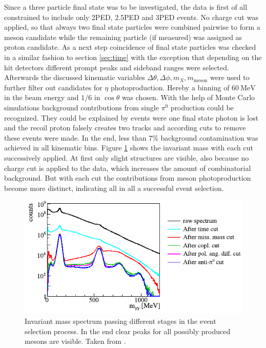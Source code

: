 Since a three particle final state was to be investigated, the data is first of all constrained to include only 2PED, 2.5PED and 3PED events. No charge cut was applied, so that always two final state particles were combined pairwise to form a meson candidate while the remaining particle (if measured) was assigned as proton candidate. As a next step coincidence of final state particles was checked in a similar fashion to section \ref{sec:time} with the exception that depending on the hit detectors different prompt peaks and sideband ranges were selected. Afterwards the discussed kinematic variables $\Delta\theta,\Delta\phi,m_X,m_\text{meson}$ were used to further filter out candidates for $\eta$ photoproduction. Hereby a binning of $\SI{60}{\mega\eV}$ in the beam energy and $1/6$ in $\cos\theta$ was chosen. With the help of Monte Carlo simulations background contributions from single $\pi^0$ production could be recognized. They could be explained by events were one final state photon is lost and the recoil proton falsely creates two tracks and according cuts to remove these events were made. In the end, less than $7\%$ background contamination was achieved in all kinematic bins. Figure \ref{fig:eta_sel} shows the invariant mass with each cut successively applied. At first only slight structures are visible, also because no charge cut is applied to the data, which increases the amount of combinatorial background. But with each cut the contributions from meson photoproduction become more distinct, indicating all in all a successful event selection.

\begin{figure}[htbp]
	\centering
	\includegraphics[width=\linewidth]{figs/eta_sel.pdf}
	\caption{Invariant mass spectrum passing different stages in the event selection process. In the end clear peaks for all possibly produced mesons are visible. Taken from \cite{farahphd}.}
	\label{fig:eta_sel}
\end{figure}
